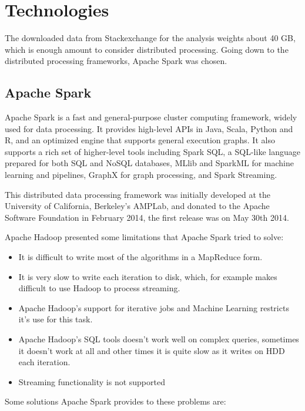\documentclass[11pt]{article} %
\begin{document}
\newpage

\section{Technologies}
  \label{sec:technologies}

  The downloaded data from Stackexchange for the analysis weights about 40 GB, which is enough amount to consider distributed processing. Going down to the distributed processing frameworks, Apache Spark was chosen.

  \subsection{Apache Spark}

    Apache Spark is a fast and general-purpose cluster computing framework, widely used for data processing. It provides high-level APIs in Java, Scala, Python and R, and an optimized engine that supports general execution graphs. It also supports a rich set of higher-level tools including Spark SQL, a SQL-like language prepared for both SQL and NoSQL databases, MLlib and SparkML for machine learning and pipelines, GraphX for graph processing, and Spark Streaming.

    This distributed data processing framework was initially developed at the University of California, Berkeley's AMPLab, and donated to the Apache Software Foundation in February 2014, the first release was on May 30th 2014.

    Apache Hadoop presented some limitations that Apache Spark tried to solve:

    \begin{itemize}
      \item It is difficult to write most of the algorithms in a MapReduce form.
      \item It is very slow to write each iteration to disk, which, for example makes difficult to use Hadoop to process streaming.
      \item Apache Hadoop's support for iterative jobs and Machine Learning restricts it's use for this task.
      \item Apache Hadoop's SQL tools doesn't work well on complex queries, sometimes it doesn't work at all and other times it is quite slow as it writes on HDD each iteration.
      \item Streaming functionality is not supported
    \end{itemize}

    Some solutions Apache Spark provides to these problems are:
\end{document}
